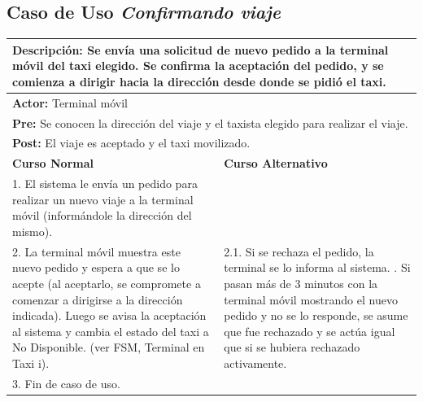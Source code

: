 \documentclass[a4paper]{article}
\begin{document}
\subsection{Caso de Uso \textit{Confirmando viaje}}
\begin{center}
\begin{tabular}{|p{8cm} | p{8cm}|}
\hline
\multicolumn{2}{|p{16cm}|}{\textbf{Descripci\'on:} Se env\'ia una solicitud de nuevo pedido a la terminal m\'ovil del taxi elegido. Se confirma la aceptaci\'on del pedido, y se comienza a dirigir hacia la direcci\'on desde donde se pidi\'o el taxi. } \\
\hline
\multicolumn{2}{|p{15cm}|}{\textbf{Actor:} Terminal m\'ovil} \\
\hline
\multicolumn{2}{|p{15cm}|}{\textbf{Pre:} Se conocen la direcci\'on del viaje y el taxista elegido para realizar el viaje.} \\
\hline
\multicolumn{2}{|p{15cm}|}{\textbf{Post:} El viaje es aceptado y el taxi movilizado.}\\
\hline
\textbf{Curso Normal}  & \textbf{Curso Alternativo} \\ \hline
1. El sistema le env\'ia un pedido para realizar un nuevo viaje a la terminal m\'ovil (inform\'andole la direcci\'on del mismo). & \\ \hline %
2. La terminal m\'ovil muestra este nuevo pedido y espera a que se lo acepte (al aceptarlo, se compromete a comenzar a dirigirse a la direcci\'on indicada). Luego se avisa la aceptaci\'on al sistema y cambia el estado del taxi a No Disponible. (ver FSM, Terminal en Taxi i). & 2.1. Si se rechaza el pedido, la terminal se lo informa al sistema. \newline 2.2. Si pasan m\'as de 3 minutos con la terminal m\'ovil mostrando el nuevo pedido y no se lo responde, se asume que fue rechazado y se act\'ua igual que si se hubiera rechazado activamente. \\ \hline
3. Fin de caso de uso. & \\ \hline
\end{tabular}
\end{center}
\end{document}
